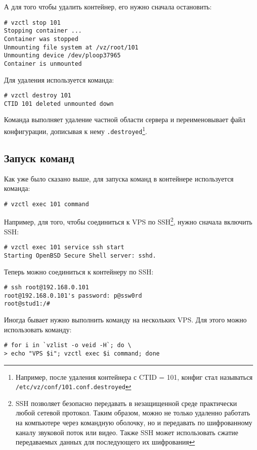 А для того чтобы удалить контейнер, его нужно сначала остановить:
\begin{lstlisting}
# vzctl stop 101
Stopping container ...
Container was stopped
Unmounting file system at /vz/root/101
Unmounting device /dev/ploop37965
Container is unmounted
\end{lstlisting}

Для удаления используется команда:
\begin{lstlisting}
# vzctl destroy 101
CTID 101 deleted unmounted down
\end{lstlisting}

Команда выполняет удаление частной области сервера и переименовывает файл конфигурации, дописывая к нему \texttt{.destroyed}\footnote{Например, после удаления контейнера с CTID = 101, конфиг стал называться \texttt{/etc/vz/conf/101.conf.destroyed}}.

\subsection{Запуск команд}
Как уже было сказано выше, для запуска команд в контейнере используется команда:
\begin{lstlisting}
# vzctl exec 101 command
\end{lstlisting}

Например, для того, чтобы соединиться к VPS по SSH\footnote{SSH позволяет безопасно передавать в незащищенной среде практически любой сетевой протокол. Таким образом, можно не только удаленно работать на компьютере через командную оболочку, но и передавать по шифрованному каналу звуковой поток или видео. Также SSH может использовать сжатие передаваемых данных для последующего их шифрования}, нужно сначала включить SSH:
\begin{lstlisting}
# vzctl exec 101 service ssh start
Starting OpenBSD Secure Shell server: sshd.
\end{lstlisting}

Теперь можно соединиться к контейнеру по SSH:
\begin{lstlisting}
# ssh root@192.168.0.101
root@192.168.0.101's password: p@ssw0rd
root@stud1:/# 
\end{lstlisting}

Иногда бывает нужно выполнить команду на нескольких VPS.
Для этого можно использовать команду:
\begin{lstlisting}
# for i in `vzlist -o veid -H`; do \
> echo "VPS $i"; vzctl exec $i command; done
\end{lstlisting}

